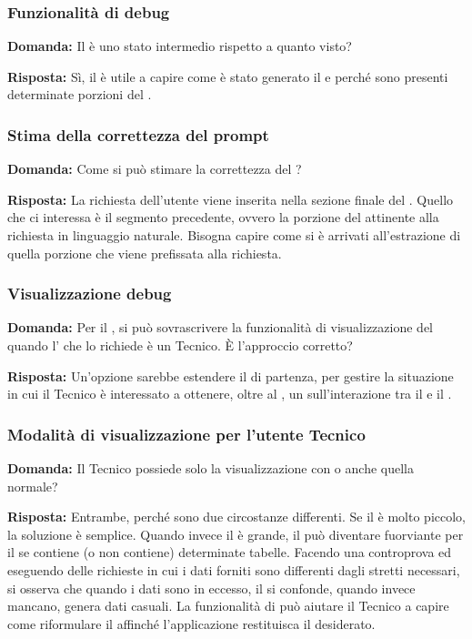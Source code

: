\subsubsection{Funzionalità di debug}

\textbf{Domanda:} Il  è uno stato intermedio rispetto a quanto visto?

\textbf{Risposta:} Sì, il  è utile a capire come è stato generato il  e perché sono presenti determinate porzioni del .


\subsubsection{Stima della correttezza del prompt}

\textbf{Domanda:} Come si può stimare la correttezza del ?

\textbf{Risposta:} La richiesta dell'utente viene inserita nella sezione finale del . Quello che ci interessa è il segmento precedente, ovvero la porzione del  attinente alla richiesta in linguaggio naturale. Bisogna capire come si è arrivati all'estrazione di quella porzione che viene prefissata alla richiesta.

\subsubsection{Visualizzazione debug}

\textbf{Domanda:} Per il , si può sovrascrivere la funzionalità di visualizzazione del  quando l' che lo richiede è un Tecnico. È l’approccio corretto?

\textbf{Risposta:} Un’opzione sarebbe estendere il  di partenza, per gestire la situazione in cui il Tecnico è interessato a ottenere, oltre al , un  sull'interazione tra il  e il .


\subsubsection{Modalità di visualizzazione per l'utente Tecnico}

\textbf{Domanda:} Il Tecnico possiede solo la visualizzazione con  o anche quella normale?

\textbf{Risposta:} Entrambe, perché sono due circostanze differenti. Se il  è molto piccolo, la soluzione è semplice. Quando invece il  è grande, il  può diventare fuorviante per il  se contiene (o non contiene) determinate tabelle. Facendo una controprova ed eseguendo delle richieste in cui i dati forniti sono differenti dagli stretti necessari, si osserva che quando i dati sono in eccesso, il  si confonde, quando invece mancano, genera dati casuali. La funzionalità di  può aiutare il Tecnico a capire come riformulare il  affinché l'applicazione restituisca il  desiderato.

